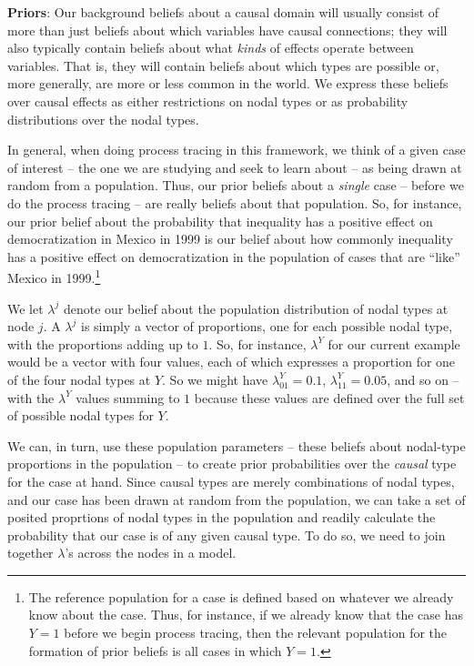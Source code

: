 \documentclass[12pt,]{book}
\let\rmarkdownfootnote\footnote%
\def\footnote{\protect\rmarkdownfootnote}
\begin{document}
\textbf{Priors}: Our background beliefs about a causal domain will usually consist of more than just beliefs about which variables have causal connections; they will also typically contain beliefs about what \emph{kinds} of effects operate between variables. That is, they will contain beliefs about which types are possible or, more generally, are more or less common in the world. We express these beliefs over causal effects as either restrictions on nodal types or as probability distributions over the nodal types.

In general, when doing process tracing in this framework, we think of a given case of interest -- the one we are studying and seek to learn about -- as being drawn at random from a population. Thus, our prior beliefs about a \emph{single} case -- before we do the process tracing -- are really beliefs about that population. So, for instance, our prior belief about the probability that inequality has a positive effect on democratization in Mexico in 1999 is our belief about how commonly inequality has a positive effect on democratization in the population of cases that are ``like'' Mexico in 1999.\footnote{The reference population for a case is defined based on whatever we already know about the case. Thus, for instance, if we already know that the case has \(Y=1\) before we begin process tracing, then the relevant population for the formation of prior beliefs is all cases in which \(Y=1\).}

We let \(\lambda^j\) denote our belief about the population distribution of nodal types at node \(j\). A \(\lambda^j\) is simply a vector of proportions, one for each possible nodal type, with the proportions adding up to \(1\). So, for instance, \(\lambda^Y\) for our current example would be a vector with four values, each of which expresses a proportion for one of the four nodal types at \(Y\). So we might have \(\lambda^Y_{01}=0.1\), \(\lambda^Y_{11}=0.05\), and so on -- with the \(\lambda^Y\) values summing to \(1\) because these values are defined over the full set of possible nodal types for \(Y\).

We can, in turn, use these population parameters -- these beliefs about nodal-type proportions in the population -- to create prior probabilities over the \emph{causal} type for the case at hand. Since causal types are merely combinations of nodal types, and our case has been drawn at random from the population, we can take a set of posited proprtions of nodal types in the population and readily calculate the probability that our case is of any given causal type. To do so, we need to join together \(\lambda\)'s across the nodes in a model.
\end{document}
